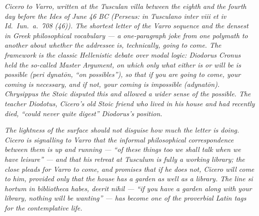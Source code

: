 
\textit{Cicero to Varro, written at the Tusculan villa between the
eighth and the fourth day before the Ides of June 46 BC (Perseus:
\textit{in Tusculano inter viii et iv Id.~Iun.~a.~708 (46)}). The
shortest letter of the Varro sequence and the densest in Greek
philosophical vocabulary --- a one-paragraph joke from one
polymath to another about whether the addressee is, technically,
going to come. The framework is the classic Hellenistic debate
over modal logic: Diodorus Cronus held the so-called Master
Argument, on which only what either is or will be is possible
(\textit{peri dynatōn}, ``on possibles''), so that if you are
going to come, your coming is necessary, and if not, your coming
is impossible (\textit{adynatōn}). Chrysippus the Stoic disputed
this and allowed a wider sense of the possible. The teacher
Diodotus, Cicero's old Stoic friend who lived in his house and
had recently died, ``could never quite digest'' Diodorus's
position.}

\textit{The lightness of the surface should not disguise how much
the letter is doing. Cicero is signalling to Varro that the
informal philosophical correspondence between them is up and
running --- ``of these things too we shall talk when we have
leisure'' --- and that his retreat at Tusculum is fully a
working library; the close pleads for Varro to come, and
promises that if he does not, Cicero will come to him, provided
only that the house has a garden as well as a library. The line
\textit{si hortum in bibliotheca habes, deerit nihil} --- ``if
you have a garden along with your library, nothing will be
wanting'' --- has become one of the proverbial Latin tags for
the contemplative life.}
